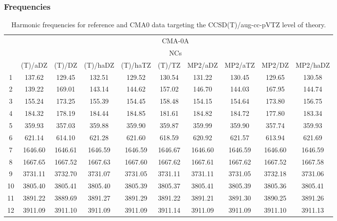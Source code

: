 \documentclass[10pt,oneside]{article}
\begin{document}
\subsubsection*{Frequencies}
\begin{table}[h!]
\centering
\caption{Harmonic frequencies for reference and CMA0 data targeting the CCSD(T)/aug-cc-pVTZ level of theory.}
\begin{tabular}{cccccccccc}
\toprule
 & \multicolumn{9}{c}{CMA-0A} \\
 & \multicolumn{9}{c}{NCs} \\
 & (T)/aDZ & (T)/DZ & (T)/haDZ & (T)/haTZ & (T)/TZ & MP2/aDZ & MP2/aTZ & MP2/DZ & MP2/haDZ \\
\midrule
1 & 137.62 & 129.45 & 132.51 & 129.52 & 130.54 & 131.22 & 130.45 & 129.65 & 130.58 \\
2 & 139.22 & 169.01 & 143.14 & 144.62 & 157.02 & 146.70 & 144.03 & 167.95 & 144.74 \\
3 & 155.24 & 173.25 & 155.39 & 154.45 & 158.48 & 154.15 & 154.64 & 173.80 & 156.75 \\
4 & 184.32 & 178.19 & 184.44 & 184.85 & 181.61 & 184.82 & 184.72 & 177.80 & 183.34 \\
5 & 359.93 & 357.03 & 359.88 & 359.90 & 359.87 & 359.99 & 359.90 & 357.74 & 359.93 \\
6 & 621.14 & 614.10 & 621.28 & 621.60 & 618.59 & 620.92 & 621.57 & 613.94 & 621.69 \\
7 & 1646.60 & 1646.61 & 1646.59 & 1646.59 & 1646.67 & 1646.60 & 1646.59 & 1646.60 & 1646.59 \\
8 & 1667.65 & 1667.52 & 1667.63 & 1667.60 & 1667.62 & 1667.61 & 1667.62 & 1667.52 & 1667.58 \\
9 & 3731.11 & 3732.70 & 3731.07 & 3731.05 & 3731.11 & 3731.11 & 3731.05 & 3732.18 & 3731.06 \\
10 & 3805.40 & 3805.41 & 3805.40 & 3805.39 & 3805.37 & 3805.41 & 3805.39 & 3805.36 & 3805.41 \\
11 & 3891.22 & 3889.69 & 3891.27 & 3891.29 & 3891.22 & 3891.21 & 3891.30 & 3890.25 & 3891.26 \\
12 & 3911.09 & 3911.10 & 3911.09 & 3911.09 & 3911.14 & 3911.09 & 3911.09 & 3911.10 & 3911.13 \\
\bottomrule
\end{tabular}
\end{table}
\end{document}
